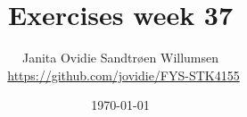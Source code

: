 \documentclass[reprint,english,notitlepage]{revtex4-1}  %
\begin{document}

\title{Exercises week 37}
\author{Janita Ovidie Sandtrøen Willumsen \\ \faGithub \, \url{https://github.com/jovidie/FYS-STK4155}}        
\date{\today}
\noaffiliation

\maketitle

\onecolumngrid
% 
% 

% 
% 
% 
% 
% 
% 
% 
 



\end{document}
